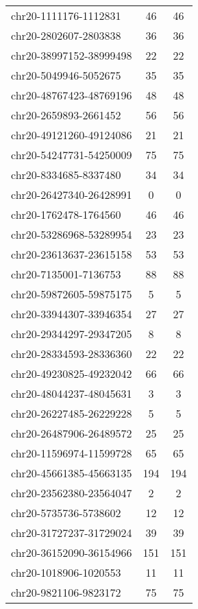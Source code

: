 \documentclass[10pt,letterpaper]{article}
\begin{document}
{\begin{longtable}{lSS}
	chr20-1111176-1112831   & 46     & 46       \\
	chr20-2802607-2803838   & 36     & 36       \\
	chr20-38997152-38999498 & 22     & 22       \\
	chr20-5049946-5052675   & 35     & 35       \\
	chr20-48767423-48769196 & 48     & 48       \\
	chr20-2659893-2661452   & 56     & 56       \\
	chr20-49121260-49124086 & 21     & 21       \\
	chr20-54247731-54250009 & 75     & 75       \\
	chr20-8334685-8337480   & 34     & 34       \\
	chr20-26427340-26428991 & 0      & 0        \\
	chr20-1762478-1764560   & 46     & 46       \\
	chr20-53286968-53289954 & 23     & 23       \\
	chr20-23613637-23615158 & 53     & 53       \\
	chr20-7135001-7136753   & 88     & 88       \\
	chr20-59872605-59875175 & 5      & 5        \\
	chr20-33944307-33946354 & 27     & 27       \\
	chr20-29344297-29347205 & 8      & 8        \\
	chr20-28334593-28336360 & 22     & 22       \\
	chr20-49230825-49232042 & 66     & 66       \\
	chr20-48044237-48045631 & 3      & 3        \\
	chr20-26227485-26229228 & 5      & 5        \\
	chr20-26487906-26489572 & 25     & 25       \\
	chr20-11596974-11599728 & 65     & 65       \\
	chr20-45661385-45663135 & 194    & 194      \\
	chr20-23562380-23564047 & 2      & 2        \\
	chr20-5735736-5738602   & 12     & 12       \\
	chr20-31727237-31729024 & 39     & 39       \\
	chr20-36152090-36154966 & 151    & 151      \\
	chr20-1018906-1020553   & 11     & 11       \\
	chr20-9821106-9823172   & 75     & 75       \\

\end{longtable}}
\end{document}
